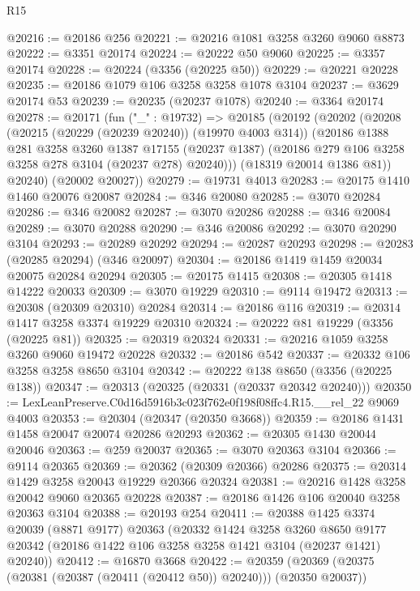 \begin{lexlean}{R15}
\begin{coremodule}
@20216 := @20186 @256
@20221 := @20216 @1081 @3258 @3260 @9060 @8873
@20222 := @3351 @20174
@20224 := @20222 @50 @9060
@20225 := @3357 @20174
@20228 := @20224 (@3356 (@20225 @50))
@20229 := @20221 @20228
@20235 := @20186 @1079 @106 @3258 @3258 @1078 @3104
@20237 := @3629 @20174 @53
@20239 := @20235 (@20237 @1078)
@20240 := @3364 @20174
@20278 := @20171
    (fun ("_" : @19732) =>
    @20185
      (@20192
        (@20202
          (@20208
            (@20215 (@20229 (@20239 @20240)) (@19970 @4003 @314))
            (@20186
              @1388
              @281
              @3258
              @3260
              @1387
              @17155
              (@20237 @1387)
              (@20186 @279 @106 @3258 @3258 @278 @3104 (@20237 @278) @20240)))
          (@18319 @20014 @1386 @81))
        @20240)
      (@20002 @20027))
@20279 := @19731 @4013
@20283 := @20175 @1410 @1460 @20076 @20087
@20284 := @346 @20080
@20285 := @3070 @20284
@20286 := @346 @20082
@20287 := @3070 @20286
@20288 := @346 @20084
@20289 := @3070 @20288
@20290 := @346 @20086
@20292 := @3070 @20290 @3104
@20293 := @20289 @20292
@20294 := @20287 @20293
@20298 := @20283 (@20285 @20294) (@346 @20097)
@20304 := @20186 @1419 @1459 @20034 @20075 @20284 @20294
@20305 := @20175 @1415
@20308 := @20305 @1418 @14222 @20033
@20309 := @3070 @19229
@20310 := @9114 @19472
@20313 := @20308 (@20309 @20310) @20284
@20314 := @20186 @116
@20319 := @20314 @1417 @3258 @3374 @19229 @20310
@20324 := @20222 @81 @19229 (@3356 (@20225 @81))
@20325 := @20319 @20324
@20331 := @20216 @1059 @3258 @3260 @9060 @19472 @20228
@20332 := @20186 @542
@20337 := @20332 @106 @3258 @3258 @8650 @3104
@20342 := @20222 @138 @8650 (@3356 (@20225 @138))
@20347 := @20313 (@20325 (@20331 (@20337 @20342 @20240)))
@20350 := LexLeanPreserve.C0d16d5916b3c023f762e0f198f08ffc4.R15.__rel_22 @9069 @4003
@20353 := @20304 (@20347 (@20350 @3668))
@20359 := @20186 @1431 @1458 @20047 @20074 @20286 @20293
@20362 := @20305 @1430 @20044 @20046
@20363 := @259 @20037
@20365 := @3070 @20363 @3104
@20366 := @9114 @20365
@20369 := @20362 (@20309 @20366) @20286
@20375 := @20314 @1429 @3258 @20043 @19229 @20366 @20324
@20381 := @20216 @1428 @3258 @20042 @9060 @20365 @20228
@20387 := @20186 @1426 @106 @20040 @3258 @20363 @3104
@20388 := @20193 @254
@20411 := @20388
    @1425
    @3374
    @20039
    (@8871 @9177)
    @20363
    (@20332
      @1424
      @3258
      @3260
      @8650
      @9177
      @20342
      (@20186 @1422 @106 @3258 @3258 @1421 @3104 (@20237 @1421) @20240))
@20412 := @16870 @3668
@20422 := @20359 (@20369 (@20375 (@20381 (@20387 (@20411 (@20412 @50)) @20240))) (@20350 @20037))

\end{coremodule}
\end{lexlean}

